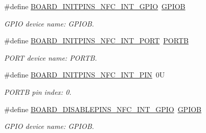 \begin{DoxyCompactItemize}
\item 
\mbox{\label{group__pin__mux_ga7e7bc23fc4f9bba41308149eb95c5582}} 
\#define \mbox{\hyperlink{group__pin__mux_ga7e7bc23fc4f9bba41308149eb95c5582}{B\+O\+A\+R\+D\+\_\+\+I\+N\+I\+T\+P\+I\+N\+S\+\_\+\+N\+F\+C\+\_\+\+I\+N\+T\+\_\+\+G\+P\+IO}}~\mbox{\hyperlink{group___g_p_i_o___peripheral___access___layer_ga68b66ac73be4c836db878a42e1fea3cd}{G\+P\+I\+OB}}
\begin{DoxyCompactList}\small\item\em G\+P\+IO device name\+: G\+P\+I\+OB. \end{DoxyCompactList}\item 
\mbox{\label{group__pin__mux_gaae8c3476c769003dd0e7ed661de3f866}} 
\#define \mbox{\hyperlink{group__pin__mux_gaae8c3476c769003dd0e7ed661de3f866}{B\+O\+A\+R\+D\+\_\+\+I\+N\+I\+T\+P\+I\+N\+S\+\_\+\+N\+F\+C\+\_\+\+I\+N\+T\+\_\+\+P\+O\+RT}}~\mbox{\hyperlink{group___p_o_r_t___peripheral___access___layer_ga09a0c85cd3da09d9cdf63a5ac4c39f77}{P\+O\+R\+TB}}
\begin{DoxyCompactList}\small\item\em P\+O\+RT device name\+: P\+O\+R\+TB. \end{DoxyCompactList}\item 
\mbox{\label{group__pin__mux_ga2599ffe23416fa4edb9b40df023cffee}} 
\#define \mbox{\hyperlink{group__pin__mux_ga2599ffe23416fa4edb9b40df023cffee}{B\+O\+A\+R\+D\+\_\+\+I\+N\+I\+T\+P\+I\+N\+S\+\_\+\+N\+F\+C\+\_\+\+I\+N\+T\+\_\+\+P\+IN}}~0U
\begin{DoxyCompactList}\small\item\em P\+O\+R\+TB pin index\+: 0. \end{DoxyCompactList}\item 
\mbox{\label{group__pin__mux_ga66922b57a233fe2bc177fc5a4f14c207}} 
\#define \mbox{\hyperlink{group__pin__mux_ga66922b57a233fe2bc177fc5a4f14c207}{B\+O\+A\+R\+D\+\_\+\+D\+I\+S\+A\+B\+L\+E\+P\+I\+N\+S\+\_\+\+N\+F\+C\+\_\+\+I\+N\+T\+\_\+\+G\+P\+IO}}~\mbox{\hyperlink{group___g_p_i_o___peripheral___access___layer_ga68b66ac73be4c836db878a42e1fea3cd}{G\+P\+I\+OB}}
\begin{DoxyCompactList}\small\item\em G\+P\+IO device name\+: G\+P\+I\+OB. \end{DoxyCompactList}\item 

\end{DoxyCompactItemize}
